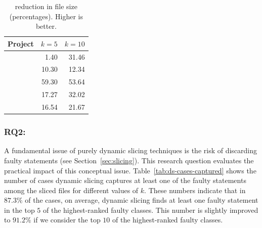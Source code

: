 \documentclass{article}
\begin{document}
\begin{table}[tb]
  \small
	\centering
	\setlength{\tabcolsep}{4pt}
	\begin{tabular}{lrr}
		\toprule
		Project             &  \multicolumn{1}{c}{$k=5$} & \multicolumn{1}{c}{$k=10$} \\ %
		\midrule

        \lang{}            & 1.40 & 31.46\\
        \cmath{}           & 10.30 & 12.34\\
		\chart{}			& 59.30 & 53.64 \\
        \jtime{}            & 17.27 & 32.02\\
        \mockito{}          & 16.54 & 21.67\\

		\bottomrule
	\end{tabular}
	\caption {\ds{} reduction in file size (percentages). Higher is better.}
	\label{tab:red}
\end{table}
\normalsize

\subsubsection{RQ2: \rqtwo}
\label{rq:2}






A fundamental issue of purely dynamic slicing techniques is the risk
of discarding faulty statements (see Section~\ref{sec:slicing}). This
research question evaluates the practical impact of this conceptual
issue. Table~\ref{tab:ds-cases-captured} shows the number of cases
dynamic slicing captures at least one of the faulty statements among
the sliced files for different values of $k$. These numbers indicate
that in $87.3\%$ of the cases, on average, dynamic slicing finds at
least one faulty statement in the top $5$ of the highest-ranked faulty
classes. This number is slightly improved to $91.2\%$ if we consider
the top $10$ of the highest-ranked faulty classes.
\end{document}
